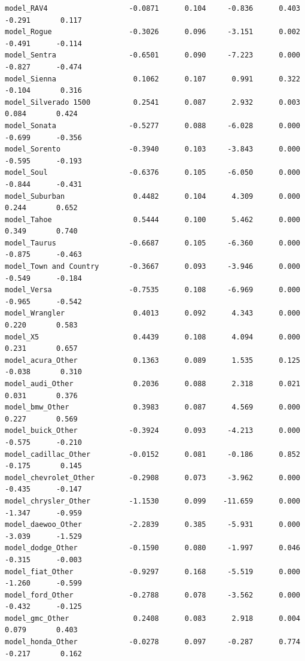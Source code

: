 \documentclass[
  12pt]{article}
\begin{document}
\begin{verbatim}
model_RAV4                   -0.0871      0.104     -0.836      0.403      -0.291       0.117
model_Rogue                  -0.3026      0.096     -3.151      0.002      -0.491      -0.114
model_Sentra                 -0.6501      0.090     -7.223      0.000      -0.827      -0.474
model_Sienna                  0.1062      0.107      0.991      0.322      -0.104       0.316
model_Silverado 1500          0.2541      0.087      2.932      0.003       0.084       0.424
model_Sonata                 -0.5277      0.088     -6.028      0.000      -0.699      -0.356
model_Sorento                -0.3940      0.103     -3.843      0.000      -0.595      -0.193
model_Soul                   -0.6376      0.105     -6.050      0.000      -0.844      -0.431
model_Suburban                0.4482      0.104      4.309      0.000       0.244       0.652
model_Tahoe                   0.5444      0.100      5.462      0.000       0.349       0.740
model_Taurus                 -0.6687      0.105     -6.360      0.000      -0.875      -0.463
model_Town and Country       -0.3667      0.093     -3.946      0.000      -0.549      -0.184
model_Versa                  -0.7535      0.108     -6.969      0.000      -0.965      -0.542
model_Wrangler                0.4013      0.092      4.343      0.000       0.220       0.583
model_X5                      0.4439      0.108      4.094      0.000       0.231       0.657
model_acura_Other             0.1363      0.089      1.535      0.125      -0.038       0.310
model_audi_Other              0.2036      0.088      2.318      0.021       0.031       0.376
model_bmw_Other               0.3983      0.087      4.569      0.000       0.227       0.569
model_buick_Other            -0.3924      0.093     -4.213      0.000      -0.575      -0.210
model_cadillac_Other         -0.0152      0.081     -0.186      0.852      -0.175       0.145
model_chevrolet_Other        -0.2908      0.073     -3.962      0.000      -0.435      -0.147
model_chrysler_Other         -1.1530      0.099    -11.659      0.000      -1.347      -0.959
model_daewoo_Other           -2.2839      0.385     -5.931      0.000      -3.039      -1.529
model_dodge_Other            -0.1590      0.080     -1.997      0.046      -0.315      -0.003
model_fiat_Other             -0.9297      0.168     -5.519      0.000      -1.260      -0.599
model_ford_Other             -0.2788      0.078     -3.562      0.000      -0.432      -0.125
model_gmc_Other               0.2408      0.083      2.918      0.004       0.079       0.403
model_honda_Other            -0.0278      0.097     -0.287      0.774      -0.217       0.162

\end{verbatim}
\end{document}

